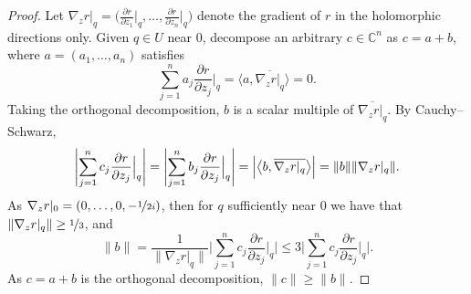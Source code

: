\documentclass[12pt,openany]{book}
\newcommand{\blinnprod}[2]{\bigl\langle #1 , #2 \bigr\rangle}
\newcommand{\snorm}[1]{\lVert {#1} \rVert}
\newcommand{\Babs}[1]{\Bigl\lvert {#1} \Bigr\rvert}
\newcommand{\BBabs}[1]{\Biggl\lvert {#1} \Biggr\rvert}
\newcommand{\abs}[1]{\left\lvert {#1} \right\rvert}
\newcommand{\C}{{\mathbb{C}}}
\theoremstyle{plain}
\theoremstyle{remark}
\theoremstyle{definition}
\theoremstyle{exercise}
\theoremstyle{example}
\begin{document}
\begin{proof}
Let $\nabla_z r|_q =
\bigl(
\frac{\partial r}{\partial z_1}\big|_q,\ldots,
\frac{\partial r}{\partial z_n}\big|_q \bigr)$ denote the gradient of $r$ in
the holomorphic directions only.
Given $q \in U$ near $0$,
decompose an arbitrary $c \in \C^n$ as $c = a+b$, where $a = (a_1,\ldots,a_n)$
satisfies
\begin{equation*}
\sum_{j=1}^n
a_j \frac{\partial r}{\partial z_j} \Big|_q = 
\blinnprod{a}{\overline{\nabla_z r|_q}}
=
0 .
\end{equation*}
Taking the orthogonal decomposition, $b$ is a scalar multiple of
$\overline{\nabla_z r|_q}$.
By Cauchy--Schwarz,
\begin{equation*}
\BBabs{\sum_{j=1}^n c_j \frac{\partial r}{\partial z_j} \Big|_q}
=
\BBabs{\sum_{j=1}^n b_j \frac{\partial r}{\partial z_j} \Big|_q}
=
\Babs{\blinnprod{b}{\overline{\nabla_z r|_q}}}
=
\snorm{b} \snorm {\nabla_z r|_q} .
\end{equation*}
As $\nabla_z r|_0 = (0,\ldots,0,-\nicefrac{1}{2i})$, then for $q$ sufficiently near $0$ we have that
$\snorm{\nabla_z r|_q} \geq \nicefrac{1}{3}$, and
\begin{equation*}
\snorm{b} =
\frac{1}{\snorm
{\nabla_z r|_q}}
\BBabs{\sum_{j=1}^n c_j \frac{\partial r}{\partial z_j} \Big|_q}
\leq
3 \BBabs{\sum_{j=1}^n c_j \frac{\partial r}{\partial z_j} \Big|_q}
.
\end{equation*}
As $c = a+b$ is the orthogonal decomposition, $\snorm{c} \geq \snorm{b}$.


\end{proof}
\end{document}
